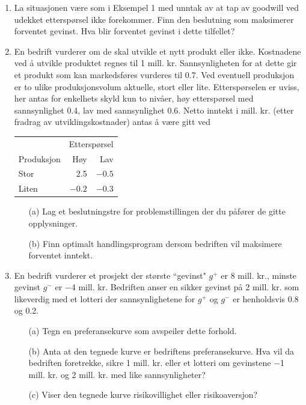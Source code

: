 {{\begin{enumerate}
\item
La situasjonen være som i Eksempel 1 med unntak av at tap av goodwill
ved udekket etterspørsel ikke forekommer.  Finn den beslutning som
maksimerer forventet gevinst.
Hva blir forventet gevinst i dette tilfellet?

\item
En bedrift vurderer om de skal utvikle et nytt produkt eller ikke.  
Kostnadene ved å utvikle produktet regnes til 1 mill. kr.
Sannsynligheten for at dette gir et produkt som kan markedsføres vurderes
til 0.7.  Ved eventuell produksjon er to ulike produksjonsvolum aktuelle,
stort eller lite.  Etterspørselen er uviss, her antas for enkelhets
skyld kun to nivåer, høy etterspørsel med sannsynlighet 0.4,
lav med sannsynlighet 0.6.  Netto inntekt i mill. kr. (etter fradrag
av utviklingskostnader) antas å være gitt ved
\begin{center}
\begin{tabular}{l|rr}
           &\multicolumn{2}{c}{Etterspørsel} \\
      Produksjon     &      Høy  &  Lav    \\ \hline
      Stor           &       2.5    & $-0.5$  \\
      Liten          &    $-0.2$    & $-0.3$  \\ \hline
\end{tabular}
\end{center}
\begin{itemize}
\item[(a)] Lag et beslutningstre for problemstillingen der du påfører
           de gitte opplysninger.
\item[(b)] Finn optimalt handlingsprogram dersom bedriften vil maksimere
           forventet inntekt.
\end{itemize}

\item
En bedrift vurderer et prosjekt der største ``gevinst" $g^+$ er 
8 mill. kr., minste gevinst $g^{-}$ er $-$4 mill. kr.  Bedriften anser
en sikker gevinst på 2 mill. kr. som likeverdig med et lotteri der
sannsynlighetene for $g^+$ og $g^{-}$ er henholdsvis 0.8 og 0.2.

\begin{itemize}
\item[(a)] Tegn en preferansekurve som avspeiler dette forhold.
\item[(b)] Anta at den tegnede kurve er bedriftens preferansekurve.
           Hva vil da bedriften foretrekke, sikre 1 mill. kr. eller et 
           lotteri om gevinstene ${-}$1 mill. kr. og 2 mill. kr. med 
           like sannsynligheter?
\item[(c)] Viser den tegnede kurve risikovillighet eller risikoaversjon?
\end{itemize}


\end{enumerate}}}
